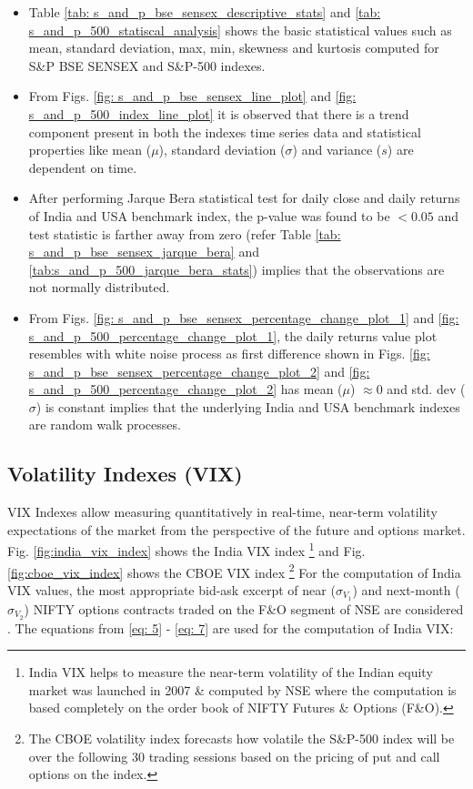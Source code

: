 \documentclass[conference]{IEEEtran}
\begin{document}
\begin{itemize}
    \item Table \ref{tab: s_and_p_bse_sensex_descriptive_stats} and \ref{tab: s_and_p_500_statiscal_analysis} shows the basic statistical values such as mean, standard deviation, max, min, skewness and kurtosis computed for S\&P BSE SENSEX and S\&P-500 indexes.
    
    \item From Figs. \ref{fig: s_and_p_bse_sensex_line_plot} and \ref{fig: s_and_p_500_index_line_plot} it is observed that there is a trend component present in both the indexes time series data and statistical properties like mean ($\mu$), standard deviation ($\sigma$) and variance ($s$) are dependent on time.
    
    \item After performing Jarque Bera statistical test for daily close and daily returns of India and USA benchmark index, the p-value was found to be $< 0.05$ and test statistic is farther away from zero (refer Table \ref{tab: s_and_p_bse_sensex_jarque_bera} and \ref{tab:s_and_p_500_jarque_bera_stats}) implies that the observations are not normally distributed.
    
    \item From Figs. \ref{fig: s_and_p_bse_sensex_percentage_change_plot_1} and \ref{fig: s_and_p_500_percentage_change_plot_1}, the daily returns value plot resembles with white noise process as first difference shown in Figs. \ref{fig: s_and_p_bse_sensex_percentage_change_plot_2} and \ref{fig: s_and_p_500_percentage_change_plot_2} has mean ($\mu$) $\approx 0$ and std. dev ($\sigma$) is constant implies that the underlying India and USA benchmark indexes are random walk processes.
\end{itemize}

\subsection{Volatility Indexes (VIX)}
VIX Indexes allow measuring quantitatively in real-time, near-term volatility expectations of the market from the perspective of the future and options market. Fig. \ref{fig:india_vix_index} shows the India VIX index \footnote{India VIX helps to measure the near-term volatility of the Indian equity market was launched in 2007 \& computed by NSE where the computation is based completely on the order book of NIFTY Futures \& Options (F\&O).} and Fig. \ref{fig:cboe_vix_index} shows the CBOE VIX index \footnote{The CBOE volatility index forecasts how volatile the S\&P-500 index will be over the following 30 trading sessions based on the pricing of put and call options on the index.} 
For the computation of India VIX values, the most appropriate bid-ask excerpt of near ($\sigma_{V_{1}}$) and next-month ($\sigma_{V_{2}}$) NIFTY options contracts traded on the F\&O segment of NSE are considered \cite{b4}. The equations from \eqref{eq: 5} - \eqref{eq: 7} are used for the computation of India VIX:
\end{document}
